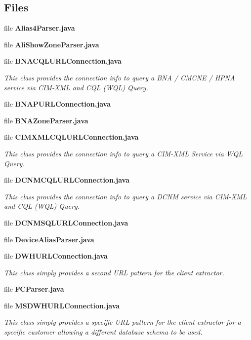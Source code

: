 \subsection*{Files}
\begin{DoxyCompactItemize}
\item 
file {\bf Alias4\+Parser.\+java}
\item 
file {\bf Ali\+Show\+Zone\+Parser.\+java}
\item 
file {\bf B\+N\+A\+C\+Q\+L\+U\+R\+L\+Connection.\+java}
\begin{DoxyCompactList}\small\item\em This class provides the connection info to query a B\+N\+A / C\+M\+C\+N\+E / H\+P\+N\+A service via C\+I\+M-\/\+X\+M\+L and C\+Q\+L (W\+Q\+L) Query. \end{DoxyCompactList}\item 
file {\bf B\+N\+A\+P\+U\+R\+L\+Connection.\+java}
\item 
file {\bf B\+N\+A\+Zone\+Parser.\+java}
\item 
file {\bf C\+I\+M\+X\+M\+L\+C\+Q\+L\+U\+R\+L\+Connection.\+java}
\begin{DoxyCompactList}\small\item\em This class provides the connection info to query a C\+I\+M-\/\+X\+M\+L Service via W\+Q\+L Query. \end{DoxyCompactList}\item 
file {\bf D\+C\+N\+M\+C\+Q\+L\+U\+R\+L\+Connection.\+java}
\begin{DoxyCompactList}\small\item\em This class provides the connection info to query a D\+C\+N\+M service via C\+I\+M-\/\+X\+M\+L and C\+Q\+L (W\+Q\+L) Query. \end{DoxyCompactList}\item 
file {\bf D\+C\+N\+M\+S\+Q\+L\+U\+R\+L\+Connection.\+java}
\item 
file {\bf Device\+Alias\+Parser.\+java}
\item 
file {\bf D\+W\+H\+U\+R\+L\+Connection.\+java}
\begin{DoxyCompactList}\small\item\em This class simply provides a second U\+R\+L pattern for the client extractor. \end{DoxyCompactList}\item 
file {\bf F\+C\+Parser.\+java}
\item 
file {\bf M\+S\+D\+W\+H\+U\+R\+L\+Connection.\+java}
\begin{DoxyCompactList}\small\item\em This class simply provides a specific U\+R\+L pattern for the client extractor for a specific customer allowing a different database schema to be used. \end{DoxyCompactList}\item 

\end{DoxyCompactItemize}
